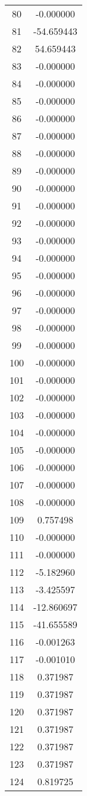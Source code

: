 \documentclass[12pt]{article}
\begin{document}
\begin{longtable}{@{}cc@{}}
80 & -0.000000 \\
81 & -54.659443 \\
82 & 54.659443 \\
83 & -0.000000 \\
84 & -0.000000 \\
85 & -0.000000 \\
86 & -0.000000 \\
87 & -0.000000 \\
88 & -0.000000 \\
89 & -0.000000 \\
90 & -0.000000 \\
91 & -0.000000 \\
92 & -0.000000 \\
93 & -0.000000 \\
94 & -0.000000 \\
95 & -0.000000 \\
96 & -0.000000 \\
97 & -0.000000 \\
98 & -0.000000 \\
99 & -0.000000 \\
100 & -0.000000 \\
101 & -0.000000 \\
102 & -0.000000 \\
103 & -0.000000 \\
104 & -0.000000 \\
105 & -0.000000 \\
106 & -0.000000 \\
107 & -0.000000 \\
108 & -0.000000 \\
109 & 0.757498 \\
110 & -0.000000 \\
111 & -0.000000 \\
112 & -5.182960 \\
113 & -3.425597 \\
114 & -12.860697 \\
115 & -41.655589 \\
116 & -0.001263 \\
117 & -0.001010 \\
118 & 0.371987 \\
119 & 0.371987 \\
120 & 0.371987 \\
121 & 0.371987 \\
122 & 0.371987 \\
123 & 0.371987 \\
124 & 0.819725 \\

\end{longtable}
\end{document}
